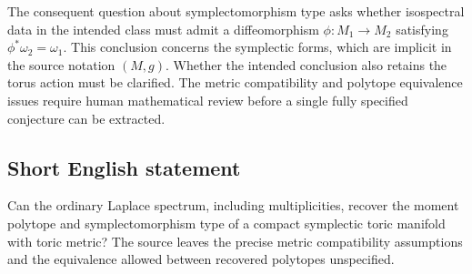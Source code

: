 \documentclass[11pt]{article}
\begin{document}
The consequent question about symplectomorphism type asks whether isospectral data in the intended class must admit a diffeomorphism \(\phi:M_1\to M_2\) satisfying \(\phi^*\omega_2=\omega_1\). This conclusion concerns the symplectic forms, which are implicit in the source notation \((M,g)\). Whether the intended conclusion also retains the torus action must be clarified. The metric compatibility and polytope equivalence issues require human mathematical review before a single fully specified conjecture can be extracted.
\subsection{Short English statement}
Can the ordinary Laplace spectrum, including multiplicities, recover the moment polytope and symplectomorphism type of a compact symplectic toric manifold with toric metric? The source leaves the precise metric compatibility assumptions and the equivalence allowed between recovered polytopes unspecified.
\end{document}

